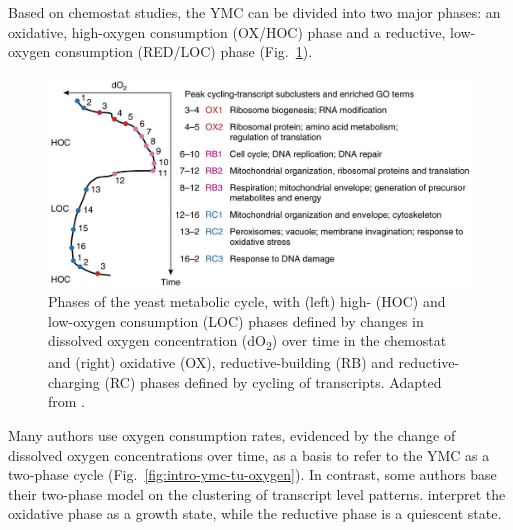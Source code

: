 Based on chemostat studies,
the YMC can be divided into two major phases: an oxidative, high-oxygen consumption (OX/HOC) phase and a reductive, low-oxygen consumption (RED/LOC) phase (Fig.\ \ref{fig:intro-ymc-overview}).

\begin{figure}[htb!]
  \centering
  \includegraphics[width=1.0\textwidth]{mellorMolecularBasisMetabolic2016_3c_adapted}
  \caption[
    Phases of the yeast metabolic cycle
  ]{
    Phases of the yeast metabolic cycle,
    with (left) high- (HOC) and low-oxygen consumption (LOC) phases defined by changes in dissolved oxygen concentration (dO\textsubscript{2}) over time in the chemostat
    and (right) oxidative (OX), reductive-building (RB) and reductive-charging (RC) phases defined by cycling of transcripts.
    Adapted from \textcite{mellorMolecularBasisMetabolic2016}.}
  \label{fig:intro-ymc-overview}
\end{figure}

Many authors \parencite{slavovMetabolicCyclingCell2011, murrayRedoxRegulationRespiring2011, caustonMetabolicRhythmsFramework2018} use oxygen consumption rates, evidenced by the change of dissolved oxygen concentrations over time, as a basis to refer to the YMC as a two-phase cycle (Fig.\ \ref{fig:intro-ymc-tu-oxygen}).
In contrast, some authors \parencite{machneYinYangYeast2012} base their two-phase model on the clustering of transcript level patterns.
\textcite{krishnaMinimalPushPull2018} interpret the oxidative phase as a growth state, while the reductive phase is a quiescent state.

